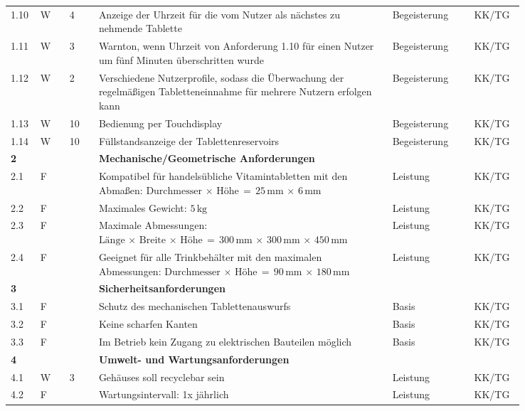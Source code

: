 \begin{longtable}{C{0.03\linewidth}C{0.05\linewidth}C{0.05\linewidth}L{0.5\linewidth}C{0.14\linewidth}C{0.07\linewidth}}
	1.10 & W & 4 & Anzeige der Uhrzeit für die vom Nutzer als nächstes zu nehmende Tablette &Begeisterung& KK/TG\\
	1.11 & W & 3 & Warnton, wenn Uhrzeit von Anforderung 1.10 für einen Nutzer um fünf Minuten überschritten wurde &Begeisterung& KK/TG\\
	1.12 & W & 2 & Verschiedene Nutzerprofile, sodass die Überwachung der regelmäßigen Tabletteneinnahme für mehrere Nutzern erfolgen kann &Begeisterung& KK/TG\\
	1.13 & W & 10 & Bedienung per Touchdisplay &Begeisterung& KK/TG\\
	1.14 & W & 10 & Füllstandsanzeige der Tablettenreservoirs &Begeisterung& KK/TG\\
	
	\midrule
	\newpage
	\textbf{2} & & & \textbf{Mechanische/Geometrische Anforderungen} &&\\
	2.1 & F & & Kompatibel für handelsübliche Vitamintabletten mit den Abmaßen: $\text{Durchmesser}\,\times\,\text{Höhe}\,=\,25\,\text{mm}\,\times\,6\,\text{mm}$ & Leistung  & KK/TG\\
	2.2 & F & & Maximales Gewicht: $5\,\text{kg}$ & Leistung & KK/TG\\
	2.3 & F & & Maximale Abmessungen: $\text{Länge}\,\times\,\text{Breite}\,\times\,\text{Höhe}\,=\,300\,\text{mm}\,\times\,300\,\text{mm}\,\times\,450\,\text{mm}$ & Leistung  & KK/TG\\
	2.4 & F & & Geeignet für alle Trinkbehälter mit den maximalen Abmessungen: $\text{Durchmesser}\,\times\,\text{Höhe}\,=\,90\,\text{mm}\,\times\,180\,\text{mm}$ & Leistung & KK/TG\\
	
	\midrule
	
	\textbf{3} & & & \textbf{Sicherheitsanforderungen} &&\\
	3.1 & F & & Schutz des mechanischen Tablettenauswurfs & Basis & KK/TG\\
	3.2 & F & & Keine scharfen Kanten & Basis & KK/TG\\
	3.3 & F & & Im Betrieb kein Zugang zu elektrischen Bauteilen möglich & Basis & KK/TG\\
	
	\midrule 
	
	\textbf{4} & & & \textbf{Umwelt- und Wartungsanforderungen} &&\\
	4.1 & W & 3 & Gehäuses soll recyclebar sein & Leistung & KK/TG\\
	4.2 & F & & Wartungsintervall: 1x jährlich & Leistung & KK/TG\\
	

\end{longtable}
